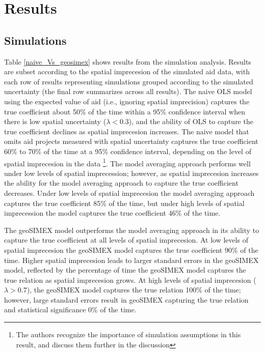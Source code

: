 \section{Results}
\subsection{Simulations}

Table \ref{naive_Vs_geosimex} shows results from the simulation analysis. 
Results are subset according to the spatial imprecesion of the simulated aid data, with each row of results representing simulations grouped according to the simulated uncertainty (the final row summarizes across all results). 
The naive OLS model using the expected value of aid (i.e., ignoring spatial imprecision) captures the true coefficient about 50\% of the time within a 95\% confidence interval when there is low spatial uncertainty ($\lambda < 0.3$), and the ability of OLS to capture the true coefficient declines as spatial imprecesion increases. 
The naive model that omits aid projects measured with spatial uncertainty captures the true coefficient 60\% to 70\% of the time at a 95\% confidence interval, depending on the level of spatial imprecesion in the data \footnote{The authors recognize the importance of simulation assumptions in this result, and discuss them further in the discussion}. 
The model averaging approach performs well under low levels of spatial imprecession; however, as spatial imprecesion increases the ability for the model averaging approach to capture the true coefficient decreases. 
Under low levels of spatial imprecesion the model averaging approach captures the true coefficient 85\% of the time, but under high levels of spatial imprecession the model captures the true coefficient 46\% of the time. 
\par
The geoSIMEX model outperforms the model averaging approach in its ability to capture the true coefficient at all levels of spatial imprecesion.
At low levels of spatial imprecesion the geoSIMEX model captures the true coefficient 90\% of the time. 
Higher spatial imprecesion leads to larger standard errors in the geoSIMEX model, reflected by the percentage of time the geoSIMEX model captures the true relation as spatial imprecesion grows. 
At high levels of spatial imprecesion ($\lambda > 0.7$), the geoSIMEX model captures the true relation 100\% of the time; however, large standard errors result in geoSIMEX capturing the true relation and statistical significance 0\% of the time.

